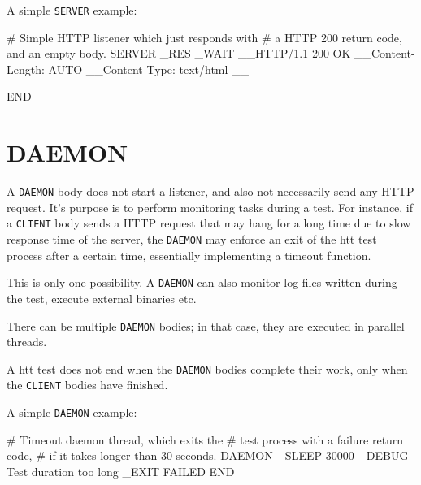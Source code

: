 A simple \texttt{SERVER} example:

\begin{usplisting}
    # Simple HTTP listener which just responds with
    # a HTTP 200 return code, and an empty body.
    SERVER
    _RES
    _WAIT
    __HTTP/1.1 200 OK
    __Content-Length: AUTO
    __Content-Type: text/html
    __

    END
\end{usplisting}



\newpage
\section{DAEMON}
\label{chap:daemon}

A \texttt{DAEMON} body does not start a listener, and also not necessarily 
send any HTTP request. It's purpose is to perform monitoring tasks during 
a test. For instance, if a \texttt{CLIENT} body sends a HTTP request that 
may hang for a long time due to slow response time of the server, the 
\texttt{DAEMON} may enforce an exit of the htt test process after a certain 
time, essentially implementing a timeout function.

This is only one possibility. A \texttt{DAEMON} can also monitor log files 
written during the test, execute external binaries etc.

There can be multiple \texttt{DAEMON} bodies; in that case, 
they are executed in parallel threads.

A htt test does not end when the \texttt{DAEMON} bodies complete their work, 
only when the \texttt{CLIENT} bodies have finished.

A simple \texttt{DAEMON} example:

\begin{usplisting}
    # Timeout daemon thread, which exits the 
    # test process with a failure return code,
    # if it takes longer than 30 seconds.
    DAEMON
    _SLEEP 30000
    _DEBUG Test duration too long
    _EXIT FAILED
    END
\end{usplisting}



